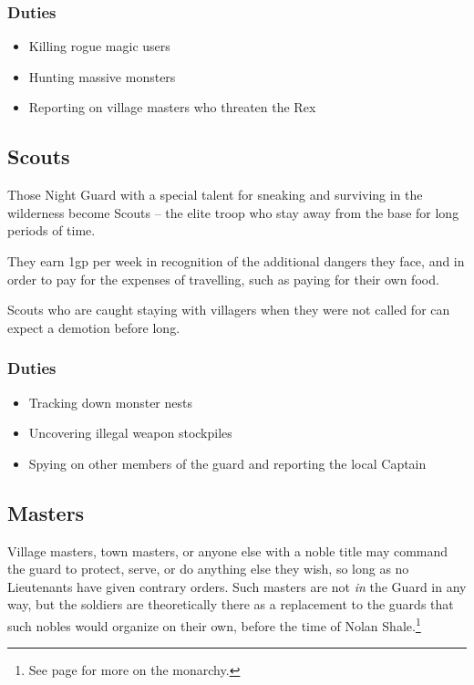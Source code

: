 \begin{multicols}{2}
\subsubsection{Duties}

\begin{itemize}

  \item{Killing rogue magic users}
  \item{Hunting massive monsters}
  \item{Reporting on village masters who threaten the Rex}
\end{itemize}

\subsection{Scouts}

Those Night Guard with a special talent for sneaking and surviving in the wilderness become Scouts -- the elite troop who stay away from the base for long periods of time.

They earn 1gp per week in recognition of the additional dangers they face, and in order to pay for the expenses of travelling, such as paying for their own food.

Scouts who are caught staying with villagers when they were not called for can expect a demotion before long.

\subsubsection{Duties}

\begin{itemize}

  \item{Tracking down monster nests}
  \item{Uncovering illegal weapon stockpiles}
  \item{Spying on other members of the \gls{guard} and reporting the local Captain}

\end{itemize}

\subsection{Masters}

Village masters, town masters, or anyone else with a noble title may command the \gls{guard} to protect, serve, or do anything else they wish, so long as no Lieutenants have given contrary orders.
Such masters are not \textit{in} the Guard in any way, but the soldiers are theoretically there as a replacement to the guards that such nobles would organize on their own, before the time of Nolan Shale.\footnote{See page \pageref{nolan} for more on the monarchy.}


\end{multicols}
